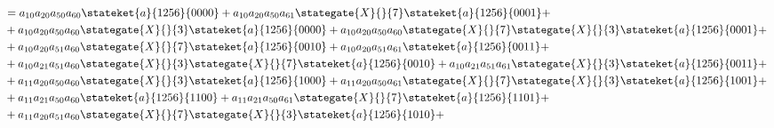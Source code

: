 \begin{align*}
             & =a_{10}a_{20}a_{50}a_{60} \stateket{a}{1256}{0000} +
  a_{10}a_{20}a_{50}a_{61} \stategate{X}{}{7} \stateket{a}{1256}{0001} +                                                                                                                                                                                                                                          \\
             & +a_{10}a_{20}a_{50}a_{60} \stategate{X}{}{3}\stateket{a}{1256}{0000} +
  a_{10}a_{20}a_{50}a_{60} \stategate{X}{}{7}\stategate{X}{}{3}\stateket{a}{1256}{0001} +                                                                                                                                                                                                                         \\
             & +a_{10}a_{20}a_{51}a_{60} \stategate{X}{}{7}\stateket{a}{1256}{0010} +
  a_{10}a_{20}a_{51}a_{61} \stateket{a}{1256}{0011} +                                                                                                                                                                                                                                                             \\
             & +a_{10}a_{21}a_{51}a_{60} \stategate{X}{}{3}\stategate{X}{}{7}\stateket{a}{1256}{0010} +
  a_{10}a_{21}a_{51}a_{61} \stategate{X}{}{3}\stateket{a}{1256}{0011} +                                                                                                                                                                                                                                           \\
             & +a_{11}a_{20}a_{50}a_{60} \stategate{X}{}{3}\stateket{a}{1256}{1000}+
  a_{11}a_{20}a_{50}a_{61} \stategate{X}{}{7}\stategate{X}{}{3}\stateket{a}{1256}{1001}+                                                                                                                                                                                                                          \\
             & +a_{11}a_{21}a_{50}a_{60} \stateket{a}{1256}{1100} +
  a_{11}a_{21}a_{50}a_{61} \stategate{X}{}{7}\stateket{a}{1256}{1101} +                                                                                                                                                                                                                                           \\
             & +a_{11}a_{20}a_{51}a_{60} \stategate{X}{}{7}\stategate{X}{}{3}\stateket{a}{1256}{1010}+

\end{align*}
